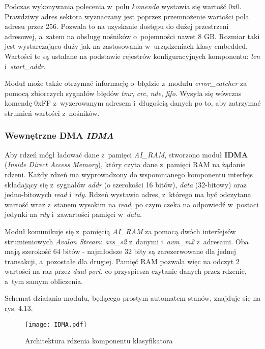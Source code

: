 Podczas wykonywania polecenia w~polu \textit{komenda} wystawia się wartość 0x0. Prawdziwy adres sektora wyznaczany jest poprzez przemnożenie wartości pola adresu przez 256. Pozwala to na uzyskanie dostępu do dużej przestrzeni adresowej, a~zatem na obsługę nośników o~pojemności nawet 8 GB. Rozmiar taki jest wystarczająco duży jak na zastosowania w~urządzeniach klasy embedded. Wartości te są ustalane na podstawie rejestrów konfiguracyjnych komponentu: \textit{len} i~\textit{start\_addr}.

Moduł może także otrzymać informację o~błędzie z~modułu \textit{error\_catcher} za pomocą zbiorczych sygnałów błędów \textit{tmr}, \textit{crc}, \textit{nde}, \textit{fifo}. Wysyła się wówczas komendę 0xFF z~wyzerowanym adresem i~długością danych po to, aby zatrzymać strumień wartości z~nośników.


\subsubsection{Wewnętrzne DMA \textit{IDMA}}

Aby rdzeń mógł ładować dane z~pamięci \textit{AI\_RAM}, stworzono moduł \textbf{IDMA} (\textit{Inside Direct Access Memory}), który czyta dane z~pamięci RAM na żądanie rdzeni. Każdy rdzeń ma wyprowadzony do wspomnianego komponentu interfejs składający się z~sygnałów \textit{addr} (o szerokości 16 bitów), \textit{data} (32-bitowy) oraz jedno-bitowych \textit{read} i~\textit{rdy}. Rdzeń wystawia adres, z~którego ma być odczytana wartość wraz z~stanem wysokim na \textit{read}, po czym czeka na odpowiedź w~postaci jedynki na \textit{rdy} i~zawartości pamięci w~\textit{data}.

Moduł komunikuje się z~pamięcią \textit{AI\_RAM} za pomocą dwóch interfejsów strumieniowych \textit{Avalon Stream}: \textit{avs\_s2} z~danymi i~\textit{avm\_m2} z~adresami. Oba mają szerokość 64 bitów - najmłodsze 32 bity są zarezerwowane dla jednej transakcji, a~pozostałe dla drugiej. Pamięć RAM pozwala więc na odczyt 2 wartości na raz przez \textit{dual port}, co przyspiesza czytanie danych przez rdzenie, a~tym samym obliczenia.

Schemat działania modułu, będącego prostym automatem stanów, znajduje się na rys. 4.13.

\begin{figure}[h]
	\centering
	\texttt{[image: IDMA.pdf]}
	\caption{Architektura rdzenia komponentu klasyfikatora}
\end{figure}
\FloatBarrier %


